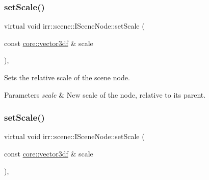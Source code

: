 \mbox{\label{classirr_1_1scene_1_1ISceneNode_a1d710e1e20546bd89affe09fa943b0e2}} 
\subsubsection{\texorpdfstring{set\+Scale()}{setScale()}\hspace{0.1cm}{\footnotesize\ttfamily [1/2]}}
{\footnotesize\ttfamily virtual void irr\+::scene\+::\+I\+Scene\+Node\+::set\+Scale (\begin{DoxyParamCaption}\item[{const \hyperlink{namespaceirr_1_1core_ae6e2b2a6c552833ebbd5b7463d03586b}{core\+::vector3df} \&}]{scale }\end{DoxyParamCaption})\hspace{0.3cm}{\ttfamily [inline]}, {\ttfamily [virtual]}}



Sets the relative scale of the scene node. 


\begin{DoxyParams}{Parameters}
{\em scale} & New scale of the node, relative to its parent. \\
\hline
\end{DoxyParams}
\mbox{\label{classirr_1_1scene_1_1ISceneNode_a1d710e1e20546bd89affe09fa943b0e2}} 
\subsubsection{\texorpdfstring{set\+Scale()}{setScale()}\hspace{0.1cm}{\footnotesize\ttfamily [2/2]}}
{\footnotesize\ttfamily virtual void irr\+::scene\+::\+I\+Scene\+Node\+::set\+Scale (\begin{DoxyParamCaption}\item[{const \hyperlink{namespaceirr_1_1core_ae6e2b2a6c552833ebbd5b7463d03586b}{core\+::vector3df} \&}]{scale }\end{DoxyParamCaption})\hspace{0.3cm}{\ttfamily [inline]}, {\ttfamily [virtual]}}



